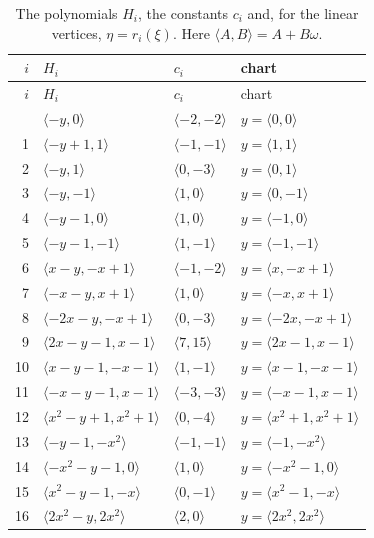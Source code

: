 \documentclass[11pt]{article}
\begin{document}
\clearpage
\begingroup\small
\setlength{\LTcapwidth}{\textwidth}
\begin{longtable}{@{}rlll@{}}
\caption{The polynomials $H_i$, the constants $c_i$ and, for the linear vertices, $\eta=r_i(\xi)$. Here $\langle A,B\rangle=A+B\omega$.}\label{tab:vert1}\\
\hline $i$ & $H_i$ & $c_i$ & chart\\\hline\endfirsthead\hline $i$ & $H_i$ & $c_i$ & chart\\\hline\endhead\hline\endfoot
0 & $\langle -y,0\rangle$ & $\langle -2,-2\rangle$ & $y=\langle 0,0\rangle$\\
1 & $\langle -y+1,1\rangle$ & $\langle -1,-1\rangle$ & $y=\langle 1,1\rangle$\\
2 & $\langle -y,1\rangle$ & $\langle 0,-3\rangle$ & $y=\langle 0,1\rangle$\\
3 & $\langle -y,-1\rangle$ & $\langle 1,0\rangle$ & $y=\langle 0,-1\rangle$\\
4 & $\langle -y-1,0\rangle$ & $\langle 1,0\rangle$ & $y=\langle -1,0\rangle$\\
5 & $\langle -y-1,-1\rangle$ & $\langle 1,-1\rangle$ & $y=\langle -1,-1\rangle$\\
6 & $\langle x-y,-x+1\rangle$ & $\langle -1,-2\rangle$ & $y=\langle x,-x+1\rangle$\\
7 & $\langle -x-y,x+1\rangle$ & $\langle 1,0\rangle$ & $y=\langle -x,x+1\rangle$\\
8 & $\langle -2x-y,-x+1\rangle$ & $\langle 0,-3\rangle$ & $y=\langle -2x,-x+1\rangle$\\
9 & $\langle 2x-y-1,x-1\rangle$ & $\langle 7,15\rangle$ & $y=\langle 2x-1,x-1\rangle$\\
10 & $\langle x-y-1,-x-1\rangle$ & $\langle 1,-1\rangle$ & $y=\langle x-1,-x-1\rangle$\\
11 & $\langle -x-y-1,x-1\rangle$ & $\langle -3,-3\rangle$ & $y=\langle -x-1,x-1\rangle$\\
12 & $\langle x^{2}-y+1,x^{2}+1\rangle$ & $\langle 0,-4\rangle$ & $y=\langle x^{2}+1,x^{2}+1\rangle$\\
13 & $\langle -y-1,-x^{2}\rangle$ & $\langle -1,-1\rangle$ & $y=\langle -1,-x^{2}\rangle$\\
14 & $\langle -x^{2}-y-1,0\rangle$ & $\langle 1,0\rangle$ & $y=\langle -x^{2}-1,0\rangle$\\
15 & $\langle x^{2}-y-1,-x\rangle$ & $\langle 0,-1\rangle$ & $y=\langle x^{2}-1,-x\rangle$\\
16 & $\langle 2x^{2}-y,2x^{2}\rangle$ & $\langle 2,0\rangle$ & $y=\langle 2x^{2},2x^{2}\rangle$\\

\end{longtable}
\end{document}
